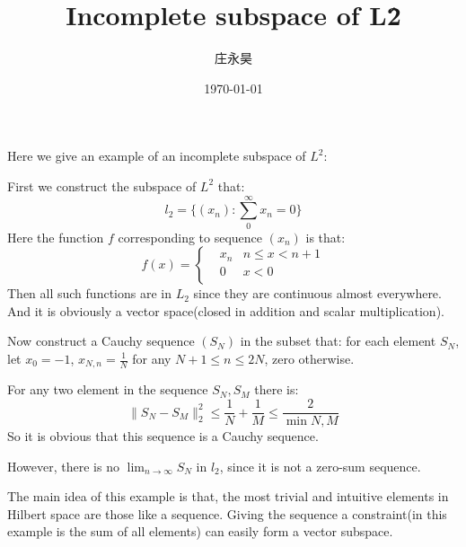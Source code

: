 \documentclass[UTF8, a4paper, linespread=1.5]{article}
\title{Incomplete subspace of L\^2}
\date{\today}
\author{庄永昊}
\begin{document}
\maketitle
    Here we give an example of an incomplete subspace of $L^2$: 

    First we construct the subspace of $L^2$ that: 
    $$l_2=\{(x_n):\sum_0^\infty x_n=0\}$$
    Here the function $f$ corresponding to sequence $(x_n)$ is that: 
    \begin{equation*}
        f(x)=\left\{
            \begin{aligned}
                &x_n&n\leq x<n+1\\
                &0&x<0\\
            \end{aligned}
            \right.
    \end{equation*}
    Then all such functions are in $L_2$ since they are continuous almost everywhere. 
    And it is obviously a vector space(closed in addition and scalar multiplication). 

    Now construct a Cauchy sequence $(S_N)$ in the subset that: for each element $S_N$, let $x_0=-1$, $x_{N,n}=\frac{1}{N}$ for any $N+1\leq n\leq 2N$, zero otherwise. 

    For any two element in the sequence $S_N,S_M$ there is: 
    $$\|S_N-S_M\|_2^2\leq \frac{1}{N}+\frac{1}{M}\leq \frac{2}{\min{N,M}}$$
    So it is obvious that this sequence is a Cauchy sequence. 

    However, there is no $\lim_{n\to\infty}S_N$ in $l_2$, since it is not a zero-sum sequence. 

    The main idea of this example is that, the most trivial and intuitive elements in Hilbert space are those like a sequence. 
    Giving the sequence a constraint(in this example is the sum of all elements) can easily form a vector subspace. 
\end{document}
